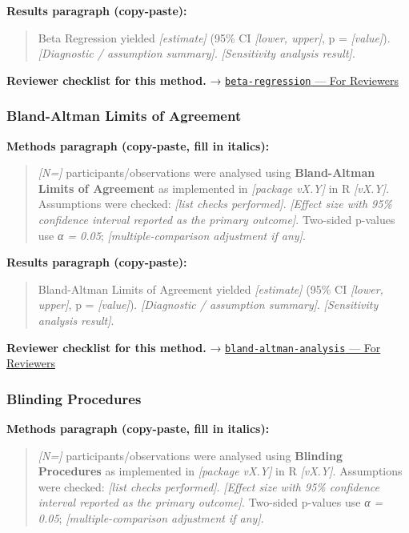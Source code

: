 \documentclass[
]{article}
\begin{document}
\textbf{Results paragraph (copy-paste):}

\begin{quote}
Beta Regression yielded \emph{{[}estimate{]}} (95\% CI \emph{{[}lower,
upper{]}}, p = \emph{{[}value{]}}). \emph{{[}Diagnostic / assumption
summary{]}}. \emph{{[}Sensitivity analysis result{]}}.
\end{quote}

\textbf{Reviewer checklist for this method.} →
\href{../chapters/07-regression/beta-regression.Rmd\#for-reviewers}{\texttt{beta-regression}
--- For Reviewers}

\subsubsection{Bland-Altman Limits of
Agreement}\label{bland-altman-limits-of-agreement}

\textbf{Methods paragraph (copy-paste, fill in italics):}

\begin{quote}
\emph{{[}N={]}} participants/observations were analysed using
\textbf{Bland-Altman Limits of Agreement} as implemented in
\emph{{[}package vX.Y{]}} in R \emph{{[}vX.Y{]}}. Assumptions were
checked: \emph{{[}list checks performed{]}}. \emph{{[}Effect size with
95\% confidence interval reported as the primary outcome{]}}. Two-sided
p-values use \emph{α = 0.05}; \emph{{[}multiple-comparison adjustment if
any{]}}.
\end{quote}

\textbf{Results paragraph (copy-paste):}

\begin{quote}
Bland-Altman Limits of Agreement yielded \emph{{[}estimate{]}} (95\% CI
\emph{{[}lower, upper{]}}, p = \emph{{[}value{]}}). \emph{{[}Diagnostic
/ assumption summary{]}}. \emph{{[}Sensitivity analysis result{]}}.
\end{quote}

\textbf{Reviewer checklist for this method.} →
\href{../chapters/14-clinical/bland-altman-analysis.Rmd\#for-reviewers}{\texttt{bland-altman-analysis}
--- For Reviewers}

\subsubsection{Blinding Procedures}\label{blinding-procedures}

\textbf{Methods paragraph (copy-paste, fill in italics):}

\begin{quote}
\emph{{[}N={]}} participants/observations were analysed using
\textbf{Blinding Procedures} as implemented in \emph{{[}package vX.Y{]}}
in R \emph{{[}vX.Y{]}}. Assumptions were checked: \emph{{[}list checks
performed{]}}. \emph{{[}Effect size with 95\% confidence interval
reported as the primary outcome{]}}. Two-sided p-values use \emph{α =
0.05}; \emph{{[}multiple-comparison adjustment if any{]}}.
\end{quote}
\end{document}

